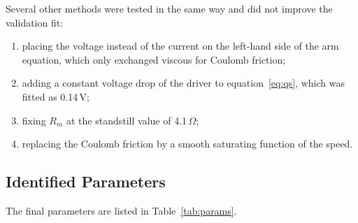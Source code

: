 \documentclass[a4paper,11pt]{article}
\begin{document}
Several other methods were tested in the same way and did not improve the validation fit:
\begin{enumerate}
  \item placing the voltage instead of the current on the left-hand side of the arm equation, which only exchanged viscous for Coulomb friction;
  \item adding a constant voltage drop of the driver to equation~\ref{eq:qs}, which was fitted as 0.14\,V;
  \item fixing $R_m$ at the standstill value of 4.1\,$\Omega$;
  \item replacing the Coulomb friction by a smooth saturating function of the speed.
\end{enumerate}

\subsection{Identified Parameters}
The final parameters are listed in Table~\ref{tab:params}.
\end{document}
